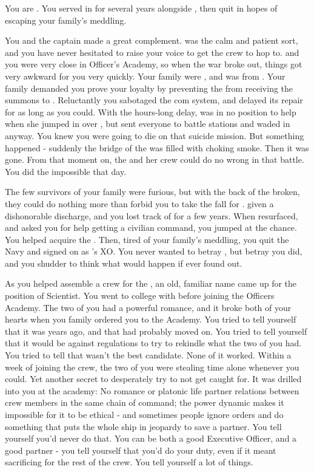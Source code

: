 \documentclass[char]{TMFHope}
\begin{document}
\name{\cXO{}}

You are \cXO{\full}. You served in \pTMN{} for several years alongside \cCap{\full}, then quit in hopes of escaping your family's meddling. 

You and the captain made a great complement. \cCap{} was the calm and patient sort, and you have never hesitated to raise your voice to get the crew to hop to. \cCap{} and you were very close in Officer's Academy, so when the war broke out, things got very awkward for you very quickly. Your family were \pEdge{}, and \cCap{} was from \pHome{}. Your family demanded you prove your loyalty by preventing the \pOld{} from receiving the summons to \pBattle{}. Reluctantly you sabotaged the \pOld{} com system, and delayed its repair for as long as you could. With the hours-long delay, \pOld{} was in no position to help when she jumped in over \pHome{}, but \cCap{} sent everyone to battle stations and waded in anyway. You knew you were going to die on that suicide mission. But something happened - suddenly the bridge of the \pOld{} was filled with choking smoke. Then it was gone. From that moment on, the \pOld{} and her crew could do no wrong in that battle. You did the impossible that day.

The few survivors of your family were furious, but with the back of the \pEdge{} broken, they could do nothing more than forbid you to take the fall for \cCap{}. \cCap{\They} \cCap{\were} given a dishonorable discharge, and you lost track of \cCap{\them} for a few years. When \cCap{\they} resurfaced, and asked you for help getting a civilian command, you jumped at the chance. You helped \cCap{} acquire the \pNew{}. Then, tired of your family's meddling, you quit the Navy and signed on as \cCap{}'s XO. You never wanted to betray \cCap{\them}, but betray you did, and you shudder to think what would happen if \cCap{} ever found out.

As you helped \cCap{} assemble a crew for the \pNew{}, an old, familiar name came up for the position of Scientist. You went to college with \cSci{} before joining the Officers Academy. The two of you had a powerful romance, and it broke both of your hearts when you family ordered you to the Academy. You tried to tell yourself that it was years ago, and that \cSci{} had probably moved on. You tried to tell yourself that it would be against regulations to try to rekindle what the two of you had. You tried to tell \cCap{} that \cSci{} wasn't the best candidate. None of it worked. Within a week of \cSci{} joining the crew, the two of you were stealing time alone whenever you could. Yet another secret to desperately try to not get caught for. It was drilled into you at the academy: No romance or platonic life partner relations between crew members in the same chain of command; the power dynamic makes it impossible for it to be ethical - and sometimes people ignore orders and do something that puts the whole ship in jeopardy to save a partner. You tell yourself you'd never do that. You can be both a good Executive Officer, and a good partner - you tell yourself that you'd do your duty, even if it meant sacrificing \cSci{} for the rest of the crew. You tell yourself a lot of things.
\end{document}
